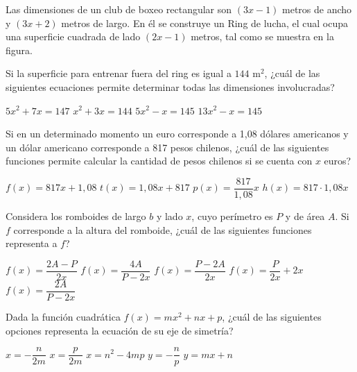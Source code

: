 \documentclass[sin nombre]{srs}
\begin{document}
\begin{preguntas}[after-item-skip=1cm]
\pregunta Las dimensiones de un club de boxeo rectangular son $(3x-1)$ metros de ancho y $(3x+2)$ metros de largo. En él se construye un Ring de lucha, el cual ocupa una superficie cuadrada de lado $(2x-1)$ metros, tal como se muestra en la figura.
\begin{centrado}
\end{centrado}
Si la superficie para entrenar fuera del ring es igual a $144 \text{ m}^2$, ¿cuál de las siguientes ecuaciones permite determinar todas las dimensiones involucradas?
\begin{vertical}
\alternativa $5x^2+7x=147$
\alternativa $x^2+3x=144$
\alternativa $5x^2-x=145$
\alternativa $13x^2-x=145$
\end{vertical}

\pregunta Si en un determinado momento un euro corresponde a 1,08 dólares
americanos y un dólar americano corresponde a 817 pesos chilenos,
¿cuál de las siguientes funciones permite calcular la cantidad de
 pesos chilenos si se cuenta con $x$ euros?
\begin{vertical}
\alternativa $f(x) = 817x + 1,08$
\alternativa $t(x) = 1,08x + 817$
\alternativa $p(x) = \dfrac{817}{1,08}x$
\alternativa $h(x) = 817 \cdot 1,08x$
\end{vertical}

\pregunta Considera los romboides de largo $b$ y lado $x$, cuyo
perímetro es $P$ y de área $A$. Si $f$ corresponde a la altura
del romboide, ¿cuál de las siguientes
funciones representa a $f$?
\begin{vertical}
\alternativa $f(x) = \dfrac{2A-P}{2x}$
\alternativa $f(x) = \dfrac{4A}{P-2x}$
\alternativa $f(x) = \dfrac{P-2A}{2x}$
\alternativa $f(x) = \dfrac{P}{2x}+2x$
\alternativa $f(x) = \dfrac{2A}{P-2x}$
\end{vertical}

\pregunta Dada la función cuadrática $f(x) = mx^2+nx+p$, ¿cuál de las siguientes opciones representa la ecuación de su eje de simetría?
\begin{vertical}
\alternativa $x = -\dfrac{n}{2m}$
\alternativa $x = \dfrac{p}{2m}$
\alternativa $x = n^2-4mp$
\alternativa $y = -\dfrac{n}{p}$
\alternativa $y = mx+n$
\end{vertical}


\end{preguntas}
\end{document}
